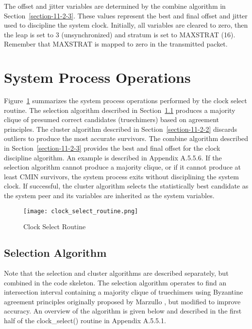 The offset and jitter variables are determined by the combine
algorithm in Section~\ref{section-11-2-3}.  These values represent the best and
final offset and jitter used to discipline the system clock.
Initially, all variables are cleared to zero, then the leap is set to
3 (unsynchronized) and stratum is set to MAXSTRAT (16).  Remember
that MAXSTRAT is mapped to zero in the transmitted packet.

\section{System Process Operations}
\label{section-11-2}

Figure~\ref{clock_select_routine} summarizes the system process operations performed by the
clock select routine.  The selection algorithm described in
Section~\ref{section-11-2-1} produces a majority clique of presumed correct
candidates (truechimers) based on agreement principles.  The cluster
algorithm described in Section~\ref{section-11-2-2} discards outliers to produce
the most accurate survivors.  The combine algorithm described in
Section~\ref{section-11-2-3} provides the best and final offset for the clock
discipline algorithm.  An example is described in Appendix A.5.5.6.
If the selection algorithm cannot produce a majority clique, or if it
cannot produce at least CMIN survivors, the system process exits
without disciplining the system clock.  If successful, the cluster
algorithm selects the statistically best candidate as the system peer
and its variables are inherited as the system variables.

\begin{figure}
\centering
\texttt{[image: clock\_select\_routine.png]}
\caption{Clock Select Routine}
\label{clock_select_routine}
\end{figure}

\subsection{Selection Algorithm}
\label{section-11-2-1}

Note that the selection and cluster algorithms are described
separately, but combined in the code skeleton.  The selection
algorithm operates to find an intersection interval containing a
majority clique of truechimers using Byzantine agreement principles
originally proposed by Marzullo \cite{ref6}, but modified to improve
accuracy.  An overview of the algorithm is given below and described
in the first half of the clock\_select() routine in Appendix A.5.5.1.


